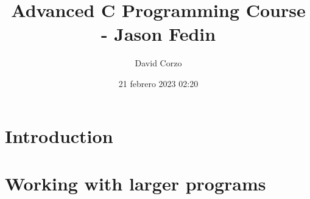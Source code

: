 \documentclass[openany]{book}
\title{Advanced C Programming Course - Jason Fedin}
\date{21 febrero 2023 02:20}
\author{David Corzo}
\begin{document}
\maketitle
\tableofcontents

\chapter{Introduction}


\chapter{Working with larger programs}




\end{document}
